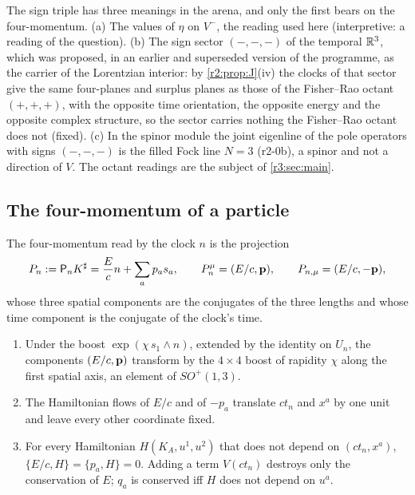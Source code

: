 \begin{remark}
\label{r2:rem:minus}
The sign triple has three meanings in the arena, and only the first bears on the four-momentum. (a) The values of $\eta$ on $V^-$, the reading used
here (interpretive: a reading of the question). (b) The sign sector $(-,-,-)$ of the temporal $\mathbb{R}^3$, which was proposed, in an earlier and superseded version of the programme, as the carrier of the Lorentzian interior: by
\cref{r2:prop:J}(iv) the clocks of that sector give the same four-planes and surplus planes as those of the Fisher--Rao octant $(+,+,+)$, with the
opposite time orientation, the opposite energy and the opposite complex structure, so the sector carries nothing the Fisher--Rao octant does not
(fixed). (c) In the spinor module the joint eigenline of the pole operators with signs $(-,-,-)$ is the filled Fock line $N=3$ (r2-0b), a spinor and not a
direction of $V$. The octant readings are the subject of \cref{r3:sec:main}.
\end{remark}

\subsection{The four-momentum of a particle}
\label{r2:sec:particle}

The four-momentum read by the clock $n$ is the projection
\begin{equation}
\label{r2:eq:P}
P_n:=\mathsf P_nK^\sharp=\frac Ecn+\sum_ap_as_a,\qquad P_n^\mu=(E/c,\mathbf p),\qquad P_{n,\mu}=(E/c,-\mathbf p),
\end{equation}
whose three spatial components are the conjugates of the three lengths and whose time component is the conjugate of the clock's time.

\begin{proposition}
\label{r2:prop:cons}
\begin{enumerate}[label=(\roman*),leftmargin=2.2em]
\item Under the boost $\exp(\chi\,s_1\wedge n)$, extended by the identity on $U_n$, the components $(E/c,\mathbf p)$ transform by the $4\times4$ boost of
rapidity $\chi$ along the first spatial axis, an element of $SO^+(1,3)$.
\item The Hamiltonian flows of $E/c$ and of $-p_a$ translate $ct_n$ and $x^a$ by one unit and leave every other coordinate fixed.
\item For every Hamiltonian $H(K_A,u^1,u^2)$ that does not depend on $(ct_n,x^a)$, $\{E/c,H\}=\{p_a,H\}=0$. Adding a term $V(ct_n)$ destroys only the
conservation of $E$; $q_a$ is conserved iff $H$ does not depend on $u^a$.
\end{enumerate}
\end{proposition}

